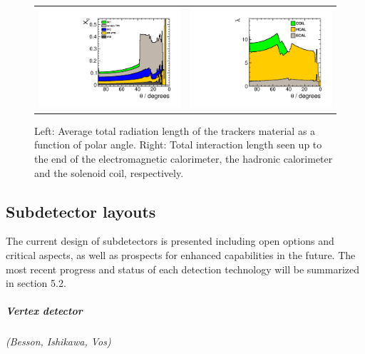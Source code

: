 \begin{figure}[t!]
\begin{tabular}{cc}
\includegraphics[width=0.5\hsize]{Modelling/fig/ILD_l5_v02_matbudget_tracker_85deg.pdf} &
\includegraphics[width=0.5\hsize]{Modelling/fig/ILD_l5_v02_matbudget_calo_85deg.pdf}
\end{tabular}
\caption[Material in the ILD detector]{Left: Average total radiation length of the trackers material as a function of polar angle. Right: Total interaction length seen up to the end of the electromagnetic calorimeter, the hadronic calorimeter and the solenoid coil, respectively.}
\label{fig:det:material}

\end{figure}

\vspace{2cm}
\subsection{Subdetector layouts}

The current design of subdetectors is presented including open options and critical aspects, as well as prospects for enhanced capabilities in the future. The most recent progress and status of each detection technology will be summarized in section 5.2.

\vspace{1cm}
\subparagraph*{\bf Vertex detector}
\textit{(Besson, Ishikawa, Vos)}

